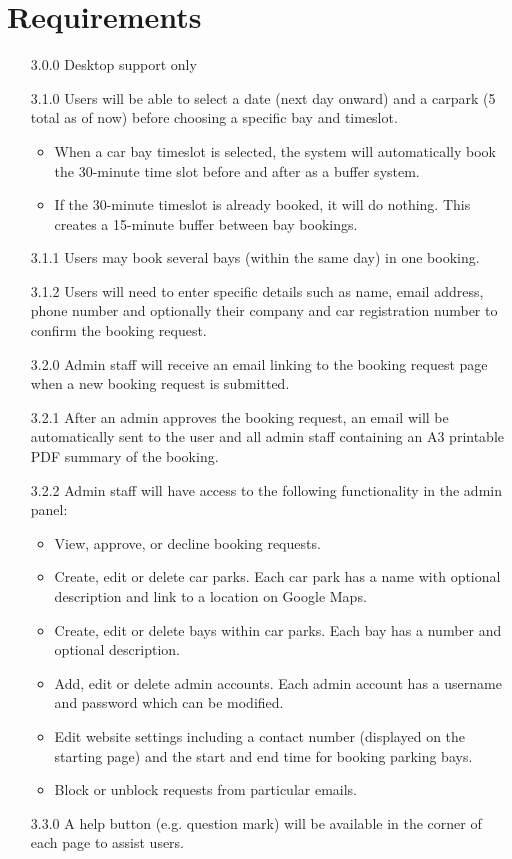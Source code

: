 \documentclass[a4paper, draft]{article}
\begin{document}
\section{Requirements}
\begin{itemize}
    \item [3.0.0] Desktop support only
    \item [3.1.0] Users will be able to select a date (next day onward) and a carpark
          (5 total as of now) before choosing a specific bay and timeslot.
          \begin{itemize}
              \item When a car bay timeslot is selected, the system will
                    automatically book the 30-minute time slot before and after
                    as a buffer system.
              \item If the 30-minute timeslot is already booked, it will do nothing.
                    This creates a 15-minute buffer between bay bookings.
          \end{itemize}
    \item [3.1.1] Users may book several bays (within the same day) in one booking.
    \item [3.1.2] Users will need to enter specific details such as name, email address,
          phone number and optionally their company and car registration number
          to confirm the booking request.
    \item [3.2.0] Admin staff will receive an email linking to the booking request page when
          a new booking request is submitted.
    \item [3.2.1] After an admin approves the booking request, an email will be automatically
          sent to the user and all admin staff containing an A3 printable PDF summary
          of the booking.
    \item [3.2.2] Admin staff will have access to the following functionality in the admin panel:
          \begin{itemize}
              \item View, approve, or decline booking requests.
              \item Create, edit or delete car parks.
                    Each car park has a name with optional description and link to a location on Google Maps.
              \item Create, edit or delete bays within car parks.
                    Each bay has a number and optional description.
              \item Add, edit or delete admin accounts.
                    Each admin account has a username and password which can be modified.
              \item Edit website settings including a contact number (displayed on the starting page)
                    and the start and end time for booking parking bays.
              \item Block or unblock requests from particular emails.
          \end{itemize}
    \item [3.3.0] A help button (e.g. question mark) will be available in the corner of each page to assist users.
\end{itemize}
\end{document}
